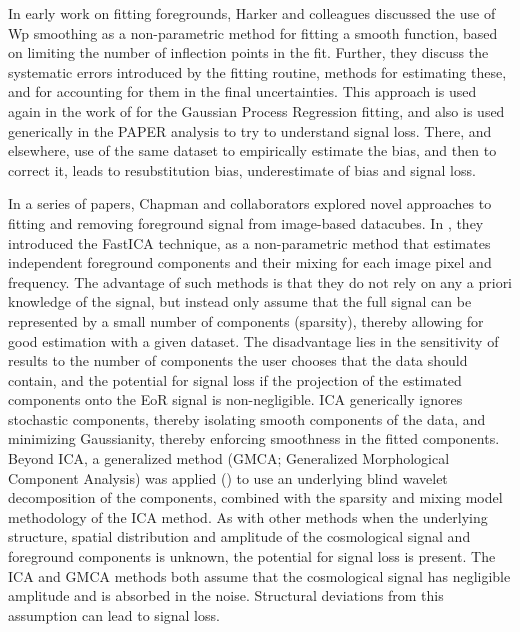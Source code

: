In early work on fitting foregrounds, Harker and colleagues \cite{2010MNRAS.405.2492H} discussed the use of Wp smoothing as a non-parametric method for fitting a smooth function, based on limiting the number of inflection points in the fit. Further, they discuss the systematic errors introduced by the fitting routine, methods for estimating these, and for accounting for them in the final uncertainties. This approach is used again in the work of \cite{2018MNRAS.478.3640M} for the Gaussian Process Regression fitting, and also is used generically in the PAPER analysis to try to understand signal loss.
There, and elsewhere, use of the same dataset to empirically estimate the bias, and then to correct it, leads to resubstitution bias, underestimate of bias and signal loss.

In a series of papers, Chapman and collaborators explored novel approaches to fitting and removing foreground signal from image-based datacubes. In \cite{2012MNRAS.423.2518C}, they introduced the FastICA technique, as a non-parametric method that estimates independent foreground components and their mixing for each image pixel and frequency. The advantage of such methods is that they do not rely on any a priori knowledge of the signal, but instead only assume that the full signal can be represented by a small number of components (sparsity), thereby allowing for good estimation with a given dataset. The disadvantage lies in the sensitivity of results to the number of components the user chooses that the data should contain, and the potential for signal loss if the projection of the estimated components onto the EoR signal is non-negligible. ICA generically ignores stochastic components, thereby isolating smooth components of the data, and minimizing Gaussianity, thereby enforcing smoothness in the fitted components. Beyond ICA, a generalized method (GMCA; Generalized Morphological Component Analysis) was applied (\cite{2013MNRAS.429..165C,chapman14}) to use an underlying blind wavelet decomposition of the components, combined with the sparsity and mixing model methodology of the ICA method. As with other methods when the underlying structure, spatial distribution and amplitude of the cosmological signal and foreground components is unknown, the potential for signal loss is present. The ICA and GMCA methods both assume that the cosmological signal has negligible amplitude and is absorbed in the noise. Structural deviations from this assumption can lead to signal loss.

